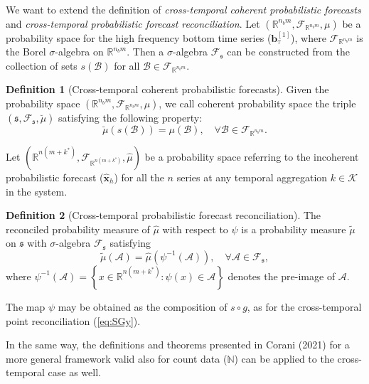 \documentclass[a4paper,11pt]{article}
\newcommand{\bvet}{\bm{b}}
\newcommand{\xvet}{\bm{x}}
\theoremstyle{definition}
\newtheorem{definition}{Definition}[section]
\begin{document}
We want to extend the definition of \textit{cross-temporal coherent probabilistic forecasts} and \textit{cross-temporal probabilistic forecast reconciliation}.
Let $\left(\mathbb{R}^{n_b m}, \mathcal{F}_{\mathbb{R}^{n_b m}}, \mu\right)$ be a probability space for the high frequency bottom time series ($\bvet_{\tau}^{[1]}$), where $\mathcal{F}_{\mathbb{R}^{n_b m}}$ is the Borel $\sigma$-algebra on $\mathbb{R}^{n_b m}$. Then a $\sigma$-algebra $\mathcal{F}_{\mathfrak{s}}$ can be constructed from the collection of sets $s(\mathcal{B})$ for all $\mathcal{B} \in \mathcal{F}_{\mathbb{R}^{n_b m}}$.
\begin{definition}[Cross-temporal coherent probabilistic forecasts]
	Given the probability space $\left(\mathbb{R}^{n_b m}, \mathcal{F}_{\mathbb{R}^{n_b m}}, \mu\right)$, we call coherent probability space the triple $\left(\mathfrak{s}, \mathcal{F}_{\mathfrak{s}}, \breve{\mu}\right)$ satisfying the following property:
$$
\breve{\mu}(s(\mathcal{B}))=\mu(\mathcal{B}), \quad \forall \mathcal{B} \in \mathcal{F}_{\mathbb{R}^{n_b m}} .
$$
\end{definition}
Let $\left(\mathbb{R}^{n(m+k^\ast)}, \mathcal{F}_{\mathbb{R}^{n(m+k^\ast)}}, \hat{\mu}\right)$ be a probability space referring to the incoherent probabilistic forecast ($\widehat{\xvet}_{h}$) for all the $n$ series at any temporal aggregation $k \in \mathcal{K}$ in the system. 
\begin{definition}[Cross-temporal probabilistic forecast reconciliation]\label{def:pfr}
The reconciled probability measure of $\hat{\mu}$ with respect to $\psi$ is a probability measure $\tilde{\mu}$ on $\mathfrak{s}$ with $\sigma$-algebra $\mathcal{F}_{\mathfrak{s}}$ satisfying
\begin{equation}\label{eq:pfr}
	\tilde{\mu}(\mathcal{A})=\hat{\mu}\left(\psi^{-1}(\mathcal{A})\right), \quad \forall \mathcal{A} \in \mathcal{F}_{\mathfrak{s}},
\end{equation}
where $\psi^{-1}(\mathcal{A})=\left\{x \in \mathbb{R}^{n(m+k^\ast)}: \psi(x) \in \mathcal{A}\right\}$ denotes the pre-image of $\mathcal{A}$.
\end{definition}
The map $\psi$ may be obtained as the composition of $s \circ g$, as for the cross-temporal point reconciliation (\ref{eq:SGy}). 


In the same way, the definitions and theorems presented in Corani (2021) for a more general framework valid also for count data ($\mathbb{N}$) can be applied to the cross-temporal case as well.

\end{document}
